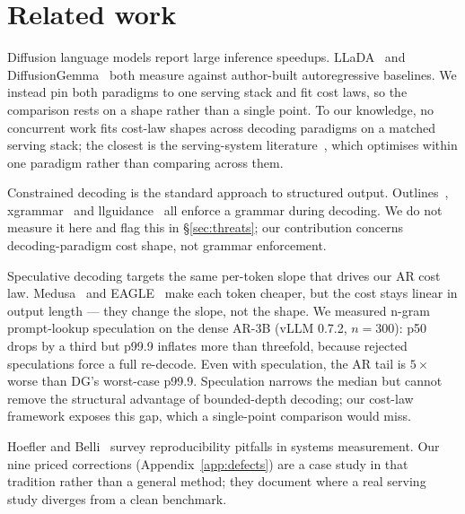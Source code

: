 \section{Related work}
\label{sec:related}

Diffusion language models report large inference speedups. LLaDA~\cite{llada2025}
and DiffusionGemma~\cite{diffusiongemma} both measure against
author-built autoregressive baselines. We instead pin both paradigms to one
serving stack and fit cost laws, so the comparison rests on a shape
rather than a single point. To our knowledge, no concurrent work fits
cost-law shapes across decoding paradigms on a matched serving stack;
the closest is the serving-system literature~\cite{vllm2023}, which
optimises within one paradigm rather than comparing across them.

Constrained decoding is the standard approach to structured output.
Outlines~\cite{outlines2024}, xgrammar~\cite{xgrammar2024} and
llguidance~\cite{llguidance} all enforce a grammar during decoding. We
do not measure it here and flag this in \S\ref{sec:threats}; our
contribution concerns decoding-paradigm cost shape, not grammar
enforcement.

Speculative decoding targets the same per-token slope that drives our
AR cost law. Medusa~\cite{medusa2024} and EAGLE~\cite{eagle2024} make
each token cheaper, but the cost stays linear in output length --- they
change the slope, not the shape. We measured n-gram prompt-lookup
speculation on the dense AR-3B (vLLM 0.7.2, $n{=}300$):
p50 drops by a third but p99.9 inflates more than threefold,
because rejected speculations force a full re-decode. Even with
speculation, the AR tail is $5\times$ worse than DG's worst-case p99.9.
Speculation narrows the median but cannot remove the structural
advantage of bounded-depth decoding; our cost-law framework exposes this
gap, which a single-point comparison would miss.

Hoefler and Belli~\cite{hoefler2021} survey reproducibility pitfalls in
systems measurement. Our nine priced corrections
(Appendix~\ref{app:defects}) are a case study in that tradition rather
than a general method; they document where a real serving study
diverges from a clean benchmark.
